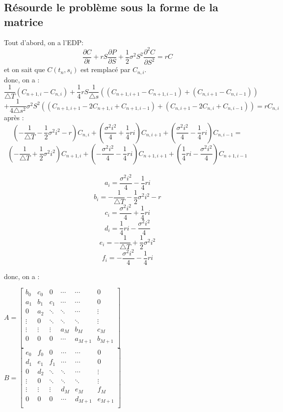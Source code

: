 \documentclass[a4paper, 12pt]{article}
\begin{document}
\subsection{Résourde le problème sous la forme de la matrice}
Tout d'abord, on a l'EDP:
\[\frac{\partial C}{\partial t} + rS\frac{\partial P}{\partial S} + \frac{1}{2}\sigma^2S^2\frac{\partial^2 C}{\partial S^2} = rC\]
et on sait que $C(t_n,s_i)$ est remplacé par $C_{n,i}$.\\

donc, on a :
\[\frac{1}{\triangle T}(C_{n+1,i} - C_{n,i}) + \frac{1}{4}rS\frac{1}{\triangle s}((C_{n+1,i+1} - C_{n+1,i-1}) + (C_{n,i+1} - C_{n,i-1}))\] \[ + \frac{1}{4\triangle s^2}\sigma^2S^2((C_{n+1,i+1} - 2C_{n+1,i} + C_{n+1,i-1}) + (C_{n,i+1} - 2C_{n,i} + C_{n,i-1})) = rC_{n,i}\]
après :
\[
\left(-\frac{1}{\triangle T} - \frac{1}{2}\sigma^2i^2 - r\right)C_{n,i} + \left(\frac{\sigma^2i^2}{4} + \frac{1}{4}ri\right)C_{n,i+1} + \left(\frac{\sigma^2i^2}{4} - \frac{1}{4}ri\right)C_{n,i-1} =  
\]
\[
\left(-\frac{1}{\triangle T} + \frac{1}{2}\sigma^2i^2\right)C_{n+1,i} + \left(-\frac{\sigma^2i^2}{4} - \frac{1}{4}ri\right)C_{n+1,i+1} + \left(\frac{1}{4}ri - \frac{\sigma^2i^2}{4}\right)C_{n+1,i-1}
\]
\\
\[a_{i} = \frac{\sigma^2i^2}{4} - \frac{1}{4}ri\]
\[b_{i} = -\frac{1}{\triangle T} - \frac{1}{2}\sigma^2i^2 - r\]
\[c_{i} = \frac{\sigma^2i^2}{4} + \frac{1}{4}ri\]
\[d_{i} = \frac{1}{4}ri - \frac{\sigma^2i^2}{4} \]
\[e_{i} = -\frac{1}{\triangle T} + \frac{1}{2}\sigma^2i^2 \]
\[f_{i} = -\frac{\sigma^2i^2}{4} - \frac{1}{4}ri \]

donc, on a :


 $A = \left[
\begin{matrix}
 b_0      & c_0      & 0      & \cdots & \cdots & 0      \\
 a_1      & b_1      & c_1     & \cdots & \cdots & 0      \\
 0      & a_2     & \ddots      & \ddots & \cdots & \vdots      \\
 \vdots      & 0      & \ddots      & \ddots & \ddots & \vdots     \\
 \vdots      & \vdots      & \vdots       & a_M & b_M & c_{M}      \\
 0      & 0      & 0      & \cdots & a_{M+1} & b_{M+1}     \\
\end{matrix}
\right]$ $\quad$ $\quad$ $\quad$
$B = \left[
\begin{matrix}
 e_0      & f_0      & 0      & \cdots & \cdots & 0      \\
 d_1      & e_1      & f_1      & \cdots & \cdots & 0      \\
 0      & d_2      & \ddots      & \ddots & \cdots & \vdots      \\
 \vdots      & 0      & \ddots      & \ddots & \ddots & \vdots     \\
 \vdots      & \vdots      & \vdots      & d_M & e_M & f_{M}      \\
 0      & 0      & 0      & \cdots & d_{M+1} & e_{M+1}     \\
\end{matrix}
\right]$\\\\
\end{document}
